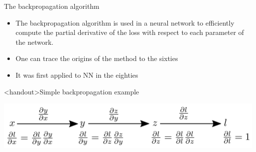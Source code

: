 \documentclass[xcolor=pdftex,dvipsnames,table,mathserif]{beamer}
\begin{document}
\begin{frame}{The backpropagation algorithm}

  \begin{itemize}
  \item The backpropagation algorithm is used in a neural network to efficiently compute the partial derivative of the loss with respect to each parameter of the network.
  \item One can trace the origins of the method to the sixties
  \item It was first applied to NN in the eighties \cite{werbos_applications_1982, lecun_procedure_1985}
  \end{itemize}


\end{frame}



\begin{frame}<handout>{Simple backpropagation example}

\includegraphics[width=\textwidth]{../graphics/bp_simple.png}

\end{frame}
\end{document}
